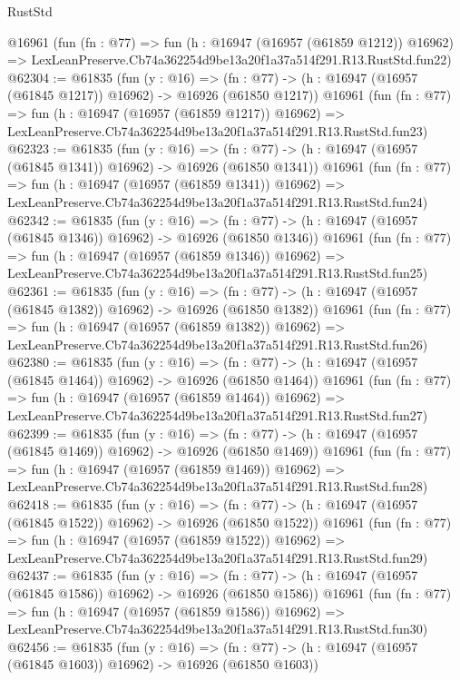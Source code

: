 \begin{lexlean}{RustStd}
\begin{coremodule}
    @16961
    (fun (fn : @77) =>
    fun (h : @16947 (@16957 (@61859 @1212)) @16962) =>
    LexLeanPreserve.Cb74a362254d9be13a20f1a37a514f291.R13.RustStd.fun22)
@62304 := @61835
    (fun (y : @16) =>
    (fn : @77) -> (h : @16947 (@16957 (@61845 @1217)) @16962) -> @16926 (@61850 @1217))
    @16961
    (fun (fn : @77) =>
    fun (h : @16947 (@16957 (@61859 @1217)) @16962) =>
    LexLeanPreserve.Cb74a362254d9be13a20f1a37a514f291.R13.RustStd.fun23)
@62323 := @61835
    (fun (y : @16) =>
    (fn : @77) -> (h : @16947 (@16957 (@61845 @1341)) @16962) -> @16926 (@61850 @1341))
    @16961
    (fun (fn : @77) =>
    fun (h : @16947 (@16957 (@61859 @1341)) @16962) =>
    LexLeanPreserve.Cb74a362254d9be13a20f1a37a514f291.R13.RustStd.fun24)
@62342 := @61835
    (fun (y : @16) =>
    (fn : @77) -> (h : @16947 (@16957 (@61845 @1346)) @16962) -> @16926 (@61850 @1346))
    @16961
    (fun (fn : @77) =>
    fun (h : @16947 (@16957 (@61859 @1346)) @16962) =>
    LexLeanPreserve.Cb74a362254d9be13a20f1a37a514f291.R13.RustStd.fun25)
@62361 := @61835
    (fun (y : @16) =>
    (fn : @77) -> (h : @16947 (@16957 (@61845 @1382)) @16962) -> @16926 (@61850 @1382))
    @16961
    (fun (fn : @77) =>
    fun (h : @16947 (@16957 (@61859 @1382)) @16962) =>
    LexLeanPreserve.Cb74a362254d9be13a20f1a37a514f291.R13.RustStd.fun26)
@62380 := @61835
    (fun (y : @16) =>
    (fn : @77) -> (h : @16947 (@16957 (@61845 @1464)) @16962) -> @16926 (@61850 @1464))
    @16961
    (fun (fn : @77) =>
    fun (h : @16947 (@16957 (@61859 @1464)) @16962) =>
    LexLeanPreserve.Cb74a362254d9be13a20f1a37a514f291.R13.RustStd.fun27)
@62399 := @61835
    (fun (y : @16) =>
    (fn : @77) -> (h : @16947 (@16957 (@61845 @1469)) @16962) -> @16926 (@61850 @1469))
    @16961
    (fun (fn : @77) =>
    fun (h : @16947 (@16957 (@61859 @1469)) @16962) =>
    LexLeanPreserve.Cb74a362254d9be13a20f1a37a514f291.R13.RustStd.fun28)
@62418 := @61835
    (fun (y : @16) =>
    (fn : @77) -> (h : @16947 (@16957 (@61845 @1522)) @16962) -> @16926 (@61850 @1522))
    @16961
    (fun (fn : @77) =>
    fun (h : @16947 (@16957 (@61859 @1522)) @16962) =>
    LexLeanPreserve.Cb74a362254d9be13a20f1a37a514f291.R13.RustStd.fun29)
@62437 := @61835
    (fun (y : @16) =>
    (fn : @77) -> (h : @16947 (@16957 (@61845 @1586)) @16962) -> @16926 (@61850 @1586))
    @16961
    (fun (fn : @77) =>
    fun (h : @16947 (@16957 (@61859 @1586)) @16962) =>
    LexLeanPreserve.Cb74a362254d9be13a20f1a37a514f291.R13.RustStd.fun30)
@62456 := @61835
    (fun (y : @16) =>
    (fn : @77) -> (h : @16947 (@16957 (@61845 @1603)) @16962) -> @16926 (@61850 @1603))

\end{coremodule}
\end{lexlean}
